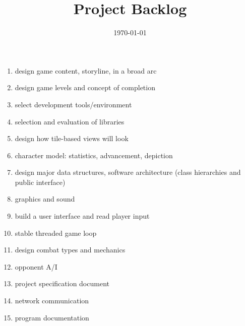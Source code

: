 \documentclass[12pt]{article}
\title{Project Backlog}
\date{\today}
\begin{document}
\maketitle

\begin{enumerate}

\item design game content, storyline, in a broad arc
\item 
design game levels and concept of completion
\item 
select development tools/environment
\item 
selection and evaluation of libraries
\item 
design how tile-based views will look
\item 
character model: statistics, advancement, depiction
\item 
design major data structures, software architecture (class hierarchies and public interface)
\item 
graphics and sound
\item 
build a user interface and read player input
\item 
stable threaded game loop
\item 
design combat types and mechanics
\item 
opponent A/I
\item 
project specification document
\item 
network communication
\item 
program documentation


\end{enumerate}
\end{document}
